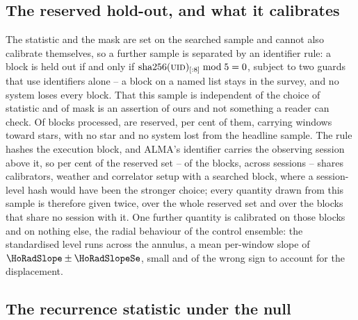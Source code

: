 \subsection{The reserved hold-out, and what it calibrates}
\label{sec:heldout}

The statistic and the mask are set on the searched sample and cannot also
calibrate themselves, so a further sample is separated by an identifier rule:
a block is held out if and only if
$\mathrm{sha256}(\textsc{uid})_{[:8]} \bmod 5 = 0$, subject to two guards that
use identifiers alone -- a block on a named list stays in the
survey, and no system loses every block. That this sample is independent of
the choice of statistic and of mask is an assertion of ours and not something
a reader can check. Of \NEbProcessedAll{} blocks processed, \NEbHeldOut{} are
reserved, \HoPctHeld{} per cent of them, carrying \HoWin{} windows toward
\HoStars{} stars, with no star and no system lost from the headline sample.
The rule hashes the execution block, and ALMA's identifier carries the
observing session above it, so \HsSharePct{} per cent of the reserved set --
\BkSessHoBlocks{} of the \NEbHeldOut{} blocks, across \BkSessShared{} sessions
-- shares calibrators, weather and correlator setup with a searched block,
where a session-level hash would have been the stronger choice; every quantity
drawn from this sample is therefore given twice, over the whole reserved set
and over the \HsIndBlocks{} blocks that share no session with it. One further
quantity is calibrated on those blocks and on nothing else, the radial
behaviour of the control ensemble: the standardised level runs \HoRadBins{}
across the annulus, a mean per-window slope of
$\HoRadSlope\pm\HoRadSlopeSe$, small and of the wrong sign to account for the
displacement.

\subsection{The recurrence statistic under the null}
\label{sec:nullscatter}

